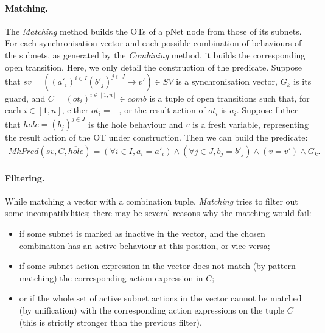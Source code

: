 \documentclass[smallcondensed]{svjour3}
\begin{document}



\paragraph{Matching.}
The \emph{Matching} method builds the OTs of a pNet node from those of
its subnets.
For each synchronisation vector and each possible
combination of behaviours of the subnets, as generated by the \emph
{Combining} method, it builds the corresponding open transition.
Here, we only detail the construction of the predicate.
Suppose that $sv = \left((a'_i)^{i\in I} (b'_j)^{j\in J}\rightarrow v'\right) \in SV$ is a synchronisation vector, $G_k$ is its guard, and
$C = ({ot}_i)^{i \in [1,n]} \in \overline{comb}$ is a tuple of open transitions such that, for each $i \in [1,n]$, either $ot_i = -$, or the result action of $ot_i$ is $a_i$. Suppose futher that $\mathit{hole} = (b_j)^{j \in J}$ is the hole behaviour and $v$ is a fresh variable, representing the result action of the OT under construction. Then we can  build the predicate:
%
\begin{multline*}
  \mathit{MkPred}(sv, C, \overline{\mathit{hole}}) = 
  (\forall i\in I, a_i=a'_i) \land
  (\forall j\in J, b_j=b'_j) \land
  (v=v') \land G_k.
\end{multline*}


\paragraph{Filtering.}
While matching a vector with a combination tuple, \emph{Matching}
tries to filter out some incompatibilities; there may be several
reasons why the matching would fail: 
\begin{itemize}
  \item if some subnet is marked as inactive in the vector, and the
    chosen combination has an active behaviour at this position, or vice-versa;
  \item if some subnet action expression in the vector does not match (by
    pattern-matching) the corresponding action expression in $C$;
  \item or if the whole set of active subnet actions in the vector
    cannot be matched (by unification) with the corresponding action expressions
      on the tuple $C$ (this is strictly stronger than the
      previous filter). 
\end {itemize}
\end{document}
